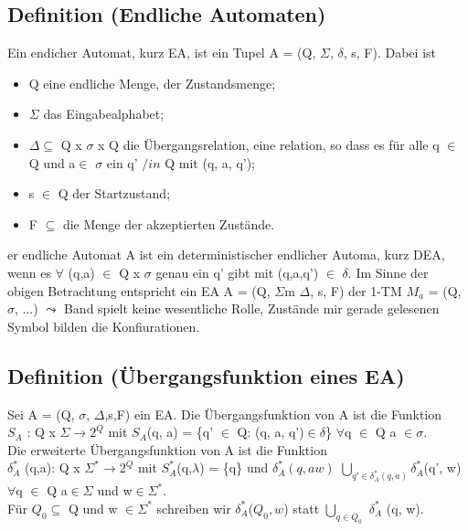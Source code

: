 \subsection{Definition (Endliche Automaten)}
Ein endicher Automat, kurz EA, ist ein Tupel A = (Q, $\Sigma$, $\delta$, s, F). Dabei ist 
\begin{itemize}
    \item Q eine endliche Menge, der Zustandsmenge;
    \item $\Sigma$ das Eingabealphabet;
    \item $\Delta \subseteq$ Q x $\sigma$ x Q die Übergangsrelation, eine relation, so dass es für alle q $\in$ Q und a$\in$ $\sigma$ ein q' $/in$ Q mit (q, a, q');
    \item s $\in$ Q der Startzustand;
    \item F $\subseteq$ die Menge der akzeptierten Zustände.
\end{itemize}
er endliche Automat A ist ein deterministischer endlicher Automa,
kurz DEA, wenn es $\forall$ (q,a) $\in$ Q x $\sigma$ genau ein q' gibt mit (q,a,q') $\in$ $\delta$. 
Im Sinne der obigen Betrachtung entspricht ein EA A = (Q, $\Sigma$m $\Delta$, s, F) der 1-TM $M_{a}$ = (Q, $\sigma$, ...)
$\leadsto $ Band spielt keine wesentliche Rolle, Zustände mir gerade gelesenen Symbol bilden die Konfiurationen.

\subsection{Definition (Übergangsfunktion eines EA)}
Sei A = (Q, $\sigma$, $\Delta$,s,F) ein EA. 
Die Übergangsfunktion von A ist die Funktion \\
$S_{A}$ : Q x $\Sigma \to 2^{Q}$ mit $S_{A}$(q, a) = \{q' $\in$ Q: (q, a, q')$\in \delta$\} $\forall$q $\in$ Q a $\in \sigma$.\\
Die erweiterte Übergangsfunktion von A ist die Funktion \\
$\delta_{A}^{*}$ (q,a): Q x $\Sigma^{*} \to 2^{Q}$ mit $S_{A}^{*}$(q,$\lambda$) = \{q\} und $\delta_{A}^{*}(q, aw)$ $\underset{q' \in \delta_{A}^{*}(q,a)}{\bigcup} \delta_{A}^{*}$(q', w) $\forall$q $\in$ Q a$\in \Sigma$ und w$\in \Sigma^{*}$.\\
Für $Q_{0} \subseteq $ Q und w $\in \Sigma^{*}$ schreiben wir $\delta_{A}^{*} $($Q_{0}, w$) statt $\underset{q \in Q_{0}}{\bigcup}$ $\delta_{A}^{*}$ (q, w).

